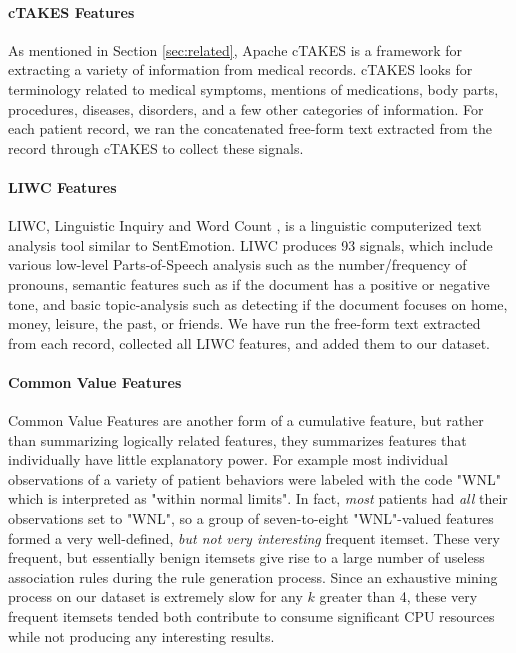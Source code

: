  \paragraph{cTAKES Features} As mentioned in Section \ref{sec:related}, \textsf{Apache cTAKES} is a framework for extracting a variety of information from medical records.
 \textsf{cTAKES} looks for terminology related to medical symptoms, mentions
 of medications, body parts, procedures, diseases, disorders, and a few other
 categories of information.  For each patient record, we ran the concatenated free-form text
 extracted from the record through \textsf{cTAKES} to collect these signals.
 

 \paragraph{LIWC Features}
  \textsf{LIWC}, Linguistic Inquiry and Word Count  \cite{liwc}, is a linguistic computerized text analysis tool similar to SentEmotion. 
 \textsf{LIWC} produces 93 signals, which include various low-level Parts-of-Speech analysis such as the number/frequency of pronouns, 
 semantic features such as if the document has a positive or negative tone, and basic topic-analysis such as detecting if the document focuses on home, money, leisure, the past, or friends.
 We have run the free-form text extracted from each record, collected all
 \textsf{LIWC} features, and added them to our dataset.
 
 
 \paragraph{Common Value Features}
\textsf{Common Value Features} are another form of a cumulative feature, but rather than summarizing logically related features, they summarizes features that individually have little explanatory power.
For example most individual observations of a variety of patient behaviors
were labeled with the code \textsf{"WNL"} which is interpreted as \textsf{"within normal limits"}.  In fact, \textit{most} patients had \textit{all} their observations
set to \textsf{"WNL"}, so a group of seven-to-eight \textsf{"WNL"}-valued features
formed a very well-defined, \textit{but not very interesting} frequent itemset.
These very frequent, but essentially benign itemsets give rise to a large number of 
useless association rules during the rule generation process. Since an exhaustive
mining process on our dataset is extremely slow for any $k$ greater than 4, these \textsf{very frequent itemsets} tended both contribute to consume
significant CPU resources while not producing any interesting results.


